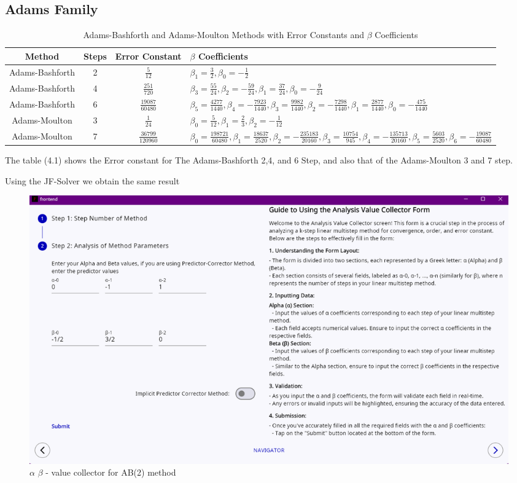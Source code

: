 \subsection{Adams Family}
\begin{table}[h!]
    \centering
    \begin{tabularx}{\textwidth}{|c|c|c|X|}
    \hline
    \textbf{Method} & \textbf{Steps} & \textbf{Error Constant} & \textbf{$\beta$ Coefficients} \\
    \hline
    Adams-Bashforth & 2 & $\frac{5}{12}$ & $\beta_1 = \frac{3}{2}, \beta_0 = -\frac{1}{2}$ \\
    \hline
    Adams-Bashforth & 4 & $\frac{251}{720}$ & $\beta_3 = \frac{55}{24}, \beta_2 = -\frac{59}{24}, \beta_1 = \frac{37}{24}, \beta_0 = -\frac{9}{24}$ \\
    \hline
    Adams-Bashforth & 6 & $\frac{19087}{60480}$ & $\beta_5 = \frac{4277}{1440}, \beta_4 = -\frac{7923}{1440}, \beta_3 = \frac{9982}{1440}, \beta_2 = -\frac{7298}{1440}, \beta_1 = \frac{2877}{1440}, \beta_0 = -\frac{475}{1440}$ \\
    \hline
    Adams-Moulton & 3 & $\frac{1}{24}$ & $\beta_0 = \frac{5}{12}, \beta_1 = \frac{2}{3}, \beta_2 = -\frac{1}{12}$ \\
    \hline
    Adams-Moulton & 7 & $\frac{36799}{120960}$ & $\beta_0 = \frac{198721}{60480}, \beta_1 = \frac{18637}{2520}, \beta_2 = -\frac{235183}{20160}, \beta_3 = \frac{10754}{945}, \beta_4 = -\frac{135713}{20160}, \beta_5 = \frac{5603}{2520}, \beta_6 = -\frac{19087}{60480}$ \\
    \hline
    \end{tabularx}
    \caption{Adams-Bashforth and Adams-Moulton Methods with Error Constants and $\beta$ Coefficients}
    \label{table:adams_methods}
    \end{table}
The table (4.1) shows the Error constant for The Adams-Bashforth 2,4, and 6 Step, and also that of the Adams-Moulton 3 and 7 step.

Using the JF-Solver we obtain the same result

\begin{figure}[htbp]
    \centering
    \includegraphics[width=1\textwidth]{chapters/4/image/ab(2)a.png}
    \caption{$\alpha$ $\beta$ - value collector for AB(2) method}
\end{figure}

